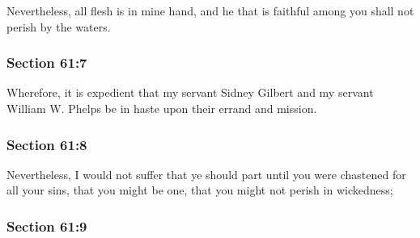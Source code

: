 		Nevertheless, all flesh is in mine hand, and he that is faithful among you shall not perish by the waters.


	\subsubsection{Section 61:7} %
		\label{DC61-7}

		Wherefore, it is expedient that my servant Sidney Gilbert and my servant William W. Phelps be in haste upon their errand and mission.


	\subsubsection{Section 61:8} %
		\label{DC61-8}

		Nevertheless, I would not suffer that ye should part until you were chastened for all your sins, that you might be one, that you might not perish in wickedness;


	\subsubsection{Section 61:9} %
		\label{DC61-9}

